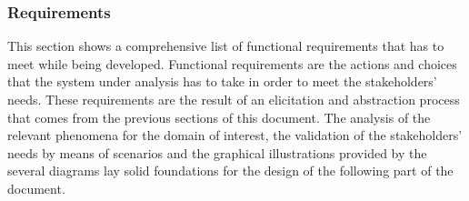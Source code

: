\subsubsection{Requirements}

This section shows a comprehensive list of functional requirements that \app has to meet while being developed. Functional requirements are the actions and choices that the system under analysis has to take in order to meet the stakeholders' needs.
These requirements are the result of an elicitation and abstraction process that comes from the previous sections of this document. The analysis of the relevant phenomena for the domain of interest, the validation of the stakeholders' needs by means of scenarios and the graphical illustrations provided by the several diagrams lay solid foundations for the design of the following part of the document. 

\vspace{1cm}

\renewcommand{\arraystretch}{1.9}

